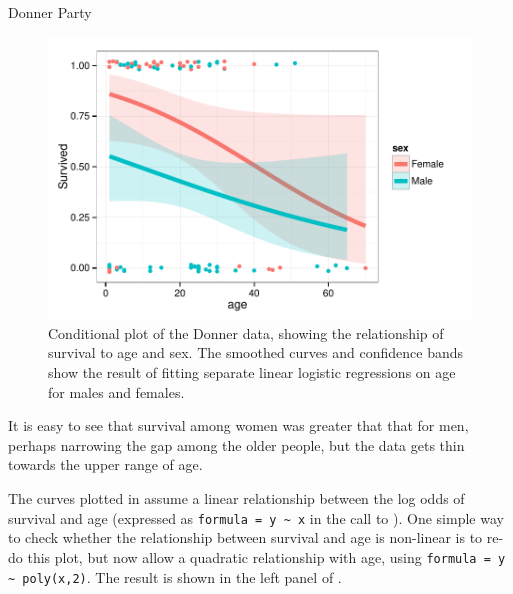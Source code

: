 \documentclass[11pt]{book}
\renewenvironment{knitrout}{\small\renewcommand{\baselinestretch}{.85}}{} %
\begin{document}
\begin{Example}[donner1]{Donner Party}
\begin{knitrout}
\begin{figure}[!htbp]
\centerline{\includegraphics[width=.7\textwidth]{ch07/fig/donner1-cond1} }

\caption[Conditional plot of the Donner data, showing the relationship of survival to age and sex]{Conditional plot of the Donner data, showing the relationship of survival to age and sex. The smoothed curves and confidence bands show the result of fitting separate linear logistic regressions on age for males and females.\label{fig:donner1-cond1}}
\end{figure}


\end{knitrout}
It is easy to see that survival among women was greater that that for men,
perhaps narrowing the gap among the older people, but the data gets thin
towards the upper range of age.

The curves plotted in  assume a linear relationship between
the log odds of survival and age (expressed as \verb|formula = y ~ x| in the call to
).  One simple way to check whether the relationship between
survival and age is non-linear is to re-do this plot, but now allow a quadratic
relationship with age, using \verb|formula = y ~ poly(x,2)|. The result is shown
in the left panel of .


\end{Example}
\end{document}
